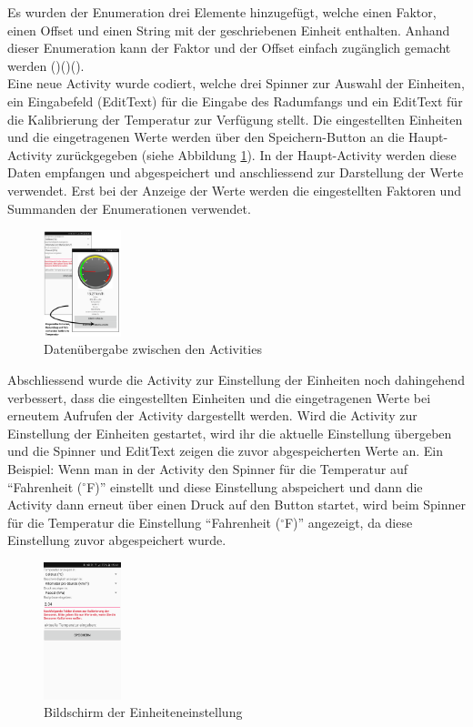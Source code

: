 Es wurden der Enumeration drei Elemente hinzugefügt, welche einen Faktor, einen Offset und einen String mit der geschriebenen Einheit enthalten. Anhand dieser Enumeration kann der Faktor und der Offset einfach zugänglich gemacht werden (\cite{calcTemp})(\cite{calcPressure})(\cite{calcVelocity}). \\

Eine neue Activity wurde codiert, welche drei Spinner zur Auswahl der Einheiten, ein Eingabefeld (EditText) für die Eingabe des Radumfangs und ein EditText für die Kalibrierung der Temperatur zur Verfügung stellt. Die eingestellten Einheiten und die eingetragenen Werte werden über den Speichern-Button an die Haupt-Activity zurückgegeben (siehe Abbildung \ref{onActivityResult}). In der Haupt-Activity werden diese Daten empfangen und abgespeichert und anschliessend zur Darstellung der Werte verwendet. Erst bei der Anzeige der Werte werden die eingestellten Faktoren und Summanden der Enumerationen verwendet.

\begin{figure}[ht]
    \includegraphics[width=0.2\textwidth]{3Vorgehen/imag/onActivityResult.PNG}
    \caption{Datenübergabe zwischen den Activities}
	\label{onActivityResult} 
\end{figure}

Abschliessend wurde die Activity zur Einstellung der Einheiten noch dahingehend verbessert, dass die eingestellten Einheiten und die eingetragenen Werte bei erneutem Aufrufen der Activity dargestellt werden. Wird die Activity zur Einstellung der Einheiten gestartet, wird ihr die aktuelle Einstellung übergeben und die Spinner und EditText zeigen die zuvor abgespeicherten Werte an. Ein Beispiel: Wenn man in der Activity den Spinner für die Temperatur auf ``Fahrenheit ($^\circ$F)'' einstellt und diese Einstellung abspeichert und dann die Activity dann erneut über einen Druck auf den Button startet, wird beim Spinner für die Temperatur die Einstellung ``Fahrenheit ($^\circ$F)'' angezeigt, da diese Einstellung zuvor abgespeichert wurde.

\begin{figure}[ht]
    \includegraphics[width=0.2\textwidth]{3Vorgehen/imag/BLEEinheitenUndEinstellungenStart.png}
    \caption{Bildschirm der Einheiteneinstellung}
	\label{BLEEinheitenUndEinstellungenStart} 
\end{figure}


